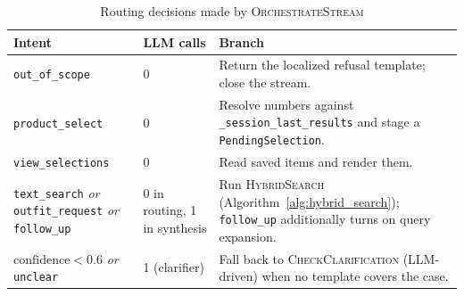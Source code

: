 \begin{table}[H]
\centering
\begin{tabular}{p{3.0cm}p{2.3cm}p{8.5cm}}
\toprule
\textbf{Intent} & \textbf{LLM calls} & \textbf{Branch}\\
\midrule
\texttt{out\_of\_scope}   & 0 & Return the localized refusal template; close the stream.\\
\texttt{product\_select}  & 0 & Resolve numbers against \texttt{\_session\_last\_results} and stage a \texttt{PendingSelection}.\\
\texttt{view\_selections} & 0 & Read saved items and render them.\\
\texttt{text\_search} \emph{or} \texttt{outfit\_request} \emph{or} \texttt{follow\_up} & 0 in routing, 1 in synthesis & Run \textsc{HybridSearch} (Algorithm~\ref{alg:hybrid_search}); \texttt{follow\_up} additionally turns on query expansion.\\
$\text{confidence} < 0.6$ \emph{or} \texttt{unclear} & 1 (clarifier) & Fall back to \textsc{CheckClarification} (LLM-driven) when no template covers the case.\\
\bottomrule
\end{tabular}
\caption{Routing decisions made by \textsc{OrchestrateStream}}
\label{tab:routing_decisions}
\end{table}

